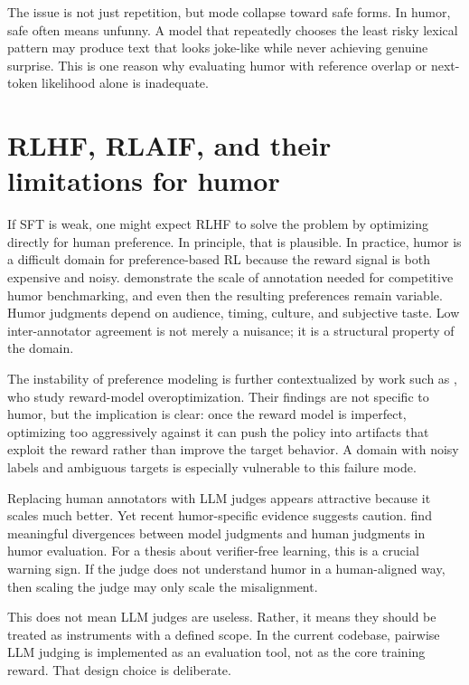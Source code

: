 \documentclass[14pt,a4paper]{extreport}
\begin{document}
The issue is not just repetition, but mode collapse toward safe forms. In humor, safe often means unfunny. A model that repeatedly chooses the least risky lexical pattern may produce text that looks joke-like while never achieving genuine surprise. This is one reason why evaluating humor with reference overlap or next-token likelihood alone is inadequate.

\section{RLHF, RLAIF, and their limitations for humor}

If SFT is weak, one might expect RLHF to solve the problem by optimizing directly for human preference. In principle, that is plausible. In practice, humor is a difficult domain for preference-based RL because the reward signal is both expensive and noisy. \citet{Zhang2024HumorAI} demonstrate the scale of annotation needed for competitive humor benchmarking, and even then the resulting preferences remain variable. Humor judgments depend on audience, timing, culture, and subjective taste. Low inter-annotator agreement is not merely a nuisance; it is a structural property of the domain.

The instability of preference modeling is further contextualized by work such as \citet{Gao2023}, who study reward-model overoptimization. Their findings are not specific to humor, but the implication is clear: once the reward model is imperfect, optimizing too aggressively against it can push the policy into artifacts that exploit the reward rather than improve the target behavior. A domain with noisy labels and ambiguous targets is especially vulnerable to this failure mode.

Replacing human annotators with LLM judges appears attractive because it scales much better. Yet recent humor-specific evidence suggests caution. \citet{Sakabe2025} find meaningful divergences between model judgments and human judgments in humor evaluation. For a thesis about verifier-free learning, this is a crucial warning sign. If the judge does not understand humor in a human-aligned way, then scaling the judge may only scale the misalignment.

This does not mean LLM judges are useless. Rather, it means they should be treated as instruments with a defined scope. In the current codebase, pairwise LLM judging is implemented as an evaluation tool, not as the core training reward. That design choice is deliberate.
\end{document}
